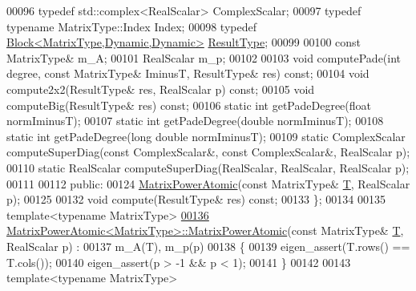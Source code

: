 \begin{DoxyCode}
00096     \textcolor{keyword}{typedef} std::complex<RealScalar> ComplexScalar;
00097     \textcolor{keyword}{typedef} \textcolor{keyword}{typename} MatrixType::Index Index;
00098     \textcolor{keyword}{typedef} \hyperlink{group___core___module_class_eigen_1_1_block}{Block<MatrixType,Dynamic,Dynamic>} 
      \hyperlink{group___core___module_class_eigen_1_1_block}{ResultType};
00099 
00100     \textcolor{keyword}{const} MatrixType& m\_A;
00101     RealScalar m\_p;
00102 
00103     \textcolor{keywordtype}{void} computePade(\textcolor{keywordtype}{int} degree, \textcolor{keyword}{const} MatrixType& IminusT, ResultType& res) \textcolor{keyword}{const};
00104     \textcolor{keywordtype}{void} compute2x2(ResultType& res, RealScalar p) \textcolor{keyword}{const};
00105     \textcolor{keywordtype}{void} computeBig(ResultType& res) \textcolor{keyword}{const};
00106     \textcolor{keyword}{static} \textcolor{keywordtype}{int} getPadeDegree(\textcolor{keywordtype}{float} normIminusT);
00107     \textcolor{keyword}{static} \textcolor{keywordtype}{int} getPadeDegree(\textcolor{keywordtype}{double} normIminusT);
00108     \textcolor{keyword}{static} \textcolor{keywordtype}{int} getPadeDegree(\textcolor{keywordtype}{long} \textcolor{keywordtype}{double} normIminusT);
00109     \textcolor{keyword}{static} ComplexScalar computeSuperDiag(\textcolor{keyword}{const} ComplexScalar&, \textcolor{keyword}{const} ComplexScalar&, RealScalar p);
00110     \textcolor{keyword}{static} RealScalar computeSuperDiag(RealScalar, RealScalar, RealScalar p);
00111 
00112   \textcolor{keyword}{public}:
00124     \hyperlink{class_eigen_1_1_matrix_power_atomic}{MatrixPowerAtomic}(\textcolor{keyword}{const} MatrixType& \hyperlink{group___sparse_core___module}{T}, RealScalar p);
00125     
00132     \textcolor{keywordtype}{void} compute(ResultType& res) \textcolor{keyword}{const};
00133 \};
00134 
00135 \textcolor{keyword}{template}<\textcolor{keyword}{typename} MatrixType>
\hyperlink{class_eigen_1_1_matrix_power_atomic_ac0ec5f8d6c203cd9b53e2c95e01037d4}{00136} \hyperlink{class_eigen_1_1_matrix_power_atomic_ac0ec5f8d6c203cd9b53e2c95e01037d4}{MatrixPowerAtomic<MatrixType>::MatrixPowerAtomic}(\textcolor{keyword}{const} 
      MatrixType& \hyperlink{group___sparse_core___module}{T}, RealScalar p) :
00137   m\_A(T), m\_p(p)
00138 \{
00139   eigen\_assert(T.rows() == T.cols());
00140   eigen\_assert(p > -1 && p < 1);
00141 \}
00142 
00143 \textcolor{keyword}{template}<\textcolor{keyword}{typename} MatrixType>

\end{DoxyCode}
